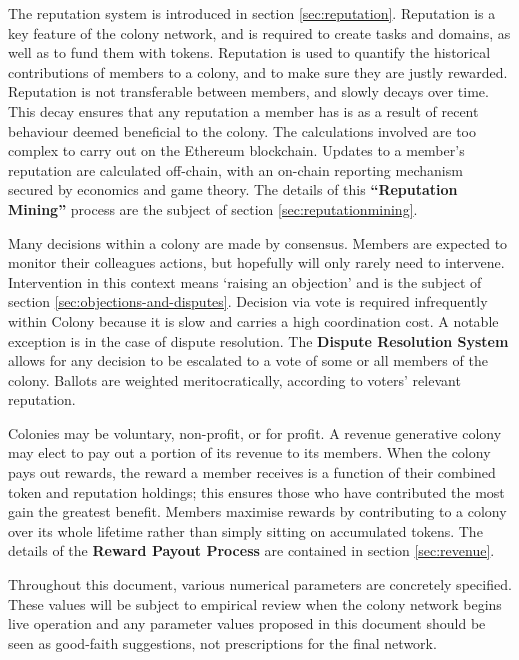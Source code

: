 The reputation system is introduced in section \ref{sec:reputation}. Reputation is a key feature of the colony network, and is required to create tasks and domains, as well as to fund them with tokens. Reputation is used to quantify the historical contributions of members to a colony, and to make sure they are justly rewarded. Reputation is not transferable between members, and slowly decays over time. This decay ensures that any reputation a member has is as a result of recent behaviour deemed beneficial to the colony. The calculations involved are too complex to carry out on the Ethereum blockchain. Updates to a member's reputation are calculated off-chain, with an on-chain reporting mechanism secured by economics and game theory. The details of this \textbf{``Reputation Mining''} process are the subject of section \ref{sec:reputationmining}.

Many decisions within a colony are made by consensus. Members are expected to monitor their colleagues actions, but hopefully will only rarely need to intervene. Intervention in this context means `raising an objection' and is the subject of section \ref{sec:objections-and-disputes}. Decision via vote is required infrequently within Colony because it is slow and carries a high coordination cost. A notable exception is in the case of dispute resolution. The \textbf{Dispute Resolution System} allows for any decision to be escalated to a vote of some or all members of the colony. Ballots are weighted meritocratically, according to voters' relevant reputation.

Colonies may be voluntary, non-profit, or for profit. A revenue generative colony may elect to pay out a portion of its revenue to its members. When the colony pays out rewards, the reward a member receives is a function of their combined token and reputation holdings; this ensures those who have contributed the most gain the greatest benefit. Members maximise rewards by contributing to a colony over its whole lifetime rather than simply sitting on accumulated tokens. The details of the \textbf{Reward Payout Process} are contained in section \ref{sec:revenue}.

Throughout this document, various numerical parameters are concretely specified. These values will be subject to empirical review when the colony network begins live operation and any parameter values proposed in this document should be seen as good-faith suggestions, not prescriptions for the final network.
